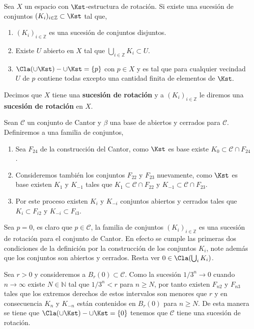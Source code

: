 \begin{df}\label{df:Suc_rot}
Sea $X$ un espacio con $\Kst$-estructura de rotación. Si existe una sucesión de conjuntos $(K_i)_{i\in \mathbb{Z}} \subset \Kst$ tal que,

	\begin{enumerate}
	\item $(K_i)_{i\in \mathbb{Z}}$ es una sucesión de conjuntos disjuntos. 
	\item Existe $U$ abierto en $X$ tal que $\bigcup_{i\in \mathbb{Z}} K_i \subset U$.
	\item $\Cla(\cup \Kst)- \cup \Kst=\{p \}$ con $p \in X$ y es tal que para cualquier vecindad $U$ de $p$ contiene todas excepto una cantidad finita de elementos de $\Kst.$
	\end{enumerate}

Decimos que $X$ tiene una \textbf{sucesión de rotación} y a $(K_i)_{i\in \mathbb{Z}}$ le diremos una \textbf{sucesión de rotación} en $X$.
\end{df}


Sean $\mathcal{C}$ un conjunto de Cantor y $\beta$ una base de abiertos y cerrados para $\mathcal{C}$. Definiremos a una familia de conjuntos, 
	
	\begin{enumerate}
		\item Sea $F_{24}$ de la construcción del Cantor, como $\Kst$ es base existe $K_0 \subset \mathcal{C} \cap F_{24}$.
		
		\item  Consideremos también los conjuntos $F_{22}$ y $F_{23}$ nuevamente, como $\Kst$ es base existen $K_1$ y $K_{-1}$ tales que $K_1 \subset \mathcal{C} \cap F_{22}$ y $K_{-1} \subset \mathcal{C} \cap F_{23}$.
		
\item Por este proceso existen $K_{i}$ y $K_{-i} $ conjuntos abiertos y cerrados tales que $K_i \subset F_{i2}$ y $K_{-i} \subset F_{i3}$.
	\end{enumerate}
Sea $p=0$, es claro que $p \in \mathcal{C}$, la familia de conjuntos $(K_i)_{i \in \mathbb{Z}}$ es una sucesión de rotación para el conjunto de Cantor. En efecto se cumple las primeras dos condiciones de la definición por la  construcción de los conjuntos $K_i$, note además que los conjuntos son abiertos y cerrados. Resta ver $0 \in \Cla(\bigcup_i K_i)$. 

Sea $r >0 $ y consideremos a $B_r(0) \subset \mathcal{C}$. Como la sucesión $1/3^n \to 0$ cuando $n \to \infty$ existe $N \in \mathbb{N}$ tal que $1/3^n < r$ para $n \geq N$, por tanto existen $F_{n2}$ y $F_{n3}$ tales que los extremos derechos de estos intervalos son menores que $r$ y en consecuencia $K_{n}$ y $K_{-n}$ están contenidos en $B_r(0)$ para $n \geq N.$ De esta manera se tiene que $\Cla(\cup \Kst)- \cup \Kst=\{0\}$ tenemos que $\mathcal{C}$ tiene una sucesión de rotación. 


